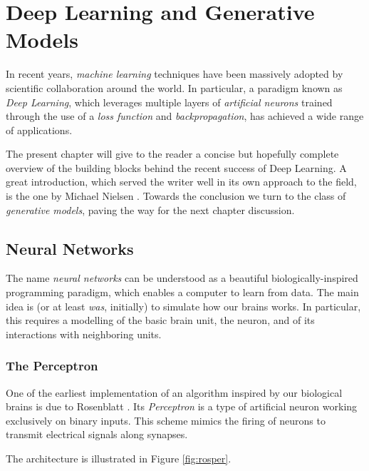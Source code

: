 \chapter{Deep Learning and Generative Models}\label{ch:dlgm}

In recent years, \emph{machine learning} techniques have been massively adopted by scientific collaboration around the world. In particular, a paradigm known as \emph{Deep Learning}, which leverages multiple layers of \emph{artificial neurons} trained through the use of a \emph{loss function} and \emph{backpropagation}, has achieved a wide range of applications.

The present chapter will give to the reader a concise but hopefully complete overview of the building blocks behind the recent success of Deep Learning. A great introduction, which served the writer well in its own approach to the field, is the one by Michael Nielsen \cite{nielsenneural}. Towards the conclusion we turn to the class of \emph{generative models}, paving the way for the next chapter discussion.
	

\section{Neural Networks}

The name \emph{neural networks} can be understood as a beautiful biologically-inspired programming paradigm, which enables a computer to learn from data. The main idea is (or at least \emph{was}, initially) to simulate how our brains works. In particular, this requires a modelling of the basic brain unit, the neuron, and of its interactions with neighboring units.

\subsection{The Perceptron}

One of the earliest implementation of an algorithm inspired  by our biological brains is due to Rosenblatt \cite{Rosenblatt1958ThePA}. Its \emph{Perceptron} is a type of artificial neuron working exclusively on binary inputs. This scheme mimics the firing of neurons to transmit electrical signals along synapses.

The architecture is illustrated in Figure \ref{fig:rosper}.

